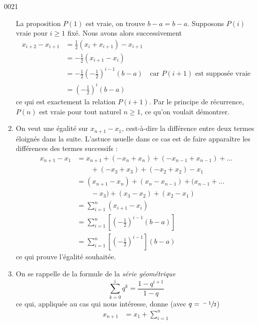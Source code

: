 \begin{corrige}{0021}
\begin{enumerate}
  La proposition $P(1)$ est vraie, on trouve $b-a = b-a$. Supposons
  $P(i)$ vraie pour $i \geq 1$ fixé. Nous avons alors successivement
  \begin{equation*}
    \begin{split}
      x_{i+2} - x_{i+1} &= \frac12 (x_{i} + x_{i+1}) - x_{i+1}\\
      &= -\frac12 \left(x_{i+1} - x_i\right)\\
      &= -\frac12 {\left(-\frac12\right)}^{i-1} (b-a) \quad\text{car } P(i+1) \text{ est supposée vraie}\\
      &= {\left(-\frac12\right)}^{i} (b-a)
    \end{split}
  \end{equation*}
  ce qui est exactement la relation $P(i+1)$. Par le principe de
  récurrence, $P(n)$ est vraie pour tout naturel $n \geq 1$, ce qu'on
  voulait démontrer.
\item On veut une égalité sur $x_{n+1} - x_1$, cest-à-dire la
  différence entre deux termes éloignés dans la suite. L'astuce
  usuelle dans ce cas est de faire apparaître les différences des
  termes successifs :
  \begin{equation*}
    \begin{split}
      x_{n+1} - x_1 &= x_{n+1} + (- x_n + x_n) + (- x_{n-1} + x_{n-1})
      + \ldots\\
      & \qquad + (- x_3 + x_3) + (- x_2 + x_2) - x_1\\
      &= (x_{n+1} - x_n) + (x_n - x_{n-1}) + (x_{n-1} + \ldots\\
      & \qquad - x_3) + (x_3 - x_2) + (x_2 - x_1)\\
      &= \sum_{i=1}^n (x_{i+1} - x_i)\\
      &= \sum_{i=1}^n \left[{\left(-\frac12\right)}^{i-1} (b-a)\right]\\
      &= \sum_{i=1}^n \left[{\left(-\frac12\right)}^{i-1}\right] (b-a)
    \end{split}
  \end{equation*}
  ce qui prouve l'égalité souhaitée.
\item On se rappelle de la formule de la \emph{série géométrique}
  \begin{equation*}
    \sum_{k=0}^i q^k = \frac{1 - q^{i+1}}{1 - q}
  \end{equation*}
  ce qui, appliquée au cas qui nous intéresse, donne (avec $q =
  \sfrac{-1}2$)
  \begin{equation*}
    \begin{split}
      x_{n+1} &= x_1 + \sum_{i=1}^n

\end{split}
\end{equation*}
\end{enumerate}
\end{corrige}
